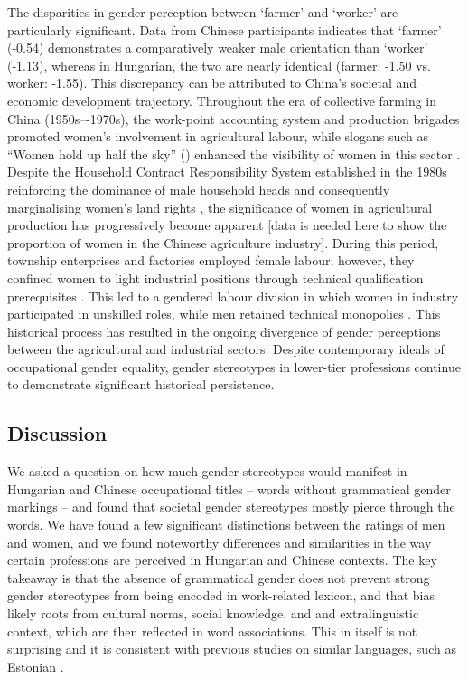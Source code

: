\documentclass[11pt]{article}
\newcommand{\zh}[1]{\simplifiedchinesefont{#1}\rmfamily}
\begin{document}
The disparities in gender perception between `farmer' and `worker' are particularly significant. Data from Chinese participants indicates that `farmer' (-0.54) demonstrates a comparatively weaker male orientation than `worker' (-1.13), whereas in Hungarian, the two are nearly identical (farmer: -1.50 vs. worker: -1.55). This discrepancy can be attributed to China’s societal and economic development trajectory. Throughout the era of collective farming in China (1950s–-1970s), the work-point accounting system and production brigades promoted women's involvement in agricultural labour, while slogans such as ``Women hold up half the sky'' (\zh{妇女能顶半边天}) enhanced the visibility of women in this sector \citep{jacka_1997_agriculture,jacka_1997_domestic}. Despite the Household Contract Responsibility System established in the 1980s reinforcing the dominance of male household heads and consequently marginalising women's land rights \citep{zhu_2009_gender}, the significance of women in agricultural production has progressively become apparent [data is needed here to show the proportion of women in the Chinese agriculture industry]. During this period, township enterprises and factories employed female labour; however, they confined women to light industrial positions through technical qualification prerequisites \citep{liu_2007_gender}. This led to a gendered labour division in which women in industry participated in unskilled roles, while men retained technical monopolies \citep{bossen_2002_chinese}. This historical process has resulted in the ongoing divergence of gender perceptions between the agricultural and industrial sectors. Despite contemporary ideals of occupational gender equality, gender stereotypes in lower-tier professions continue to demonstrate significant historical persistence.




\subsection{Discussion}\label{sec:discussion}

We asked a question on how much gender stereotypes would manifest in Hungarian and Chinese occupational titles -- words without grammatical gender markings -- and found that societal gender stereotypes mostly pierce through the words. We have found a few significant distinctions between the ratings of men and women, and we found noteworthy differences and similarities in the way certain professions are perceived in Hungarian and Chinese contexts. The key takeaway is that the absence of grammatical gender does not prevent strong gender stereotypes from being encoded in work-related lexicon, and that bias likely roots from cultural norms, social knowledge, and and extralinguistic context, which are then reflected in word associations. This in itself is not surprising and it is consistent with previous studies on similar languages, such as Estonian \citet{kaukonen_2025_gender}. 
\end{document}
